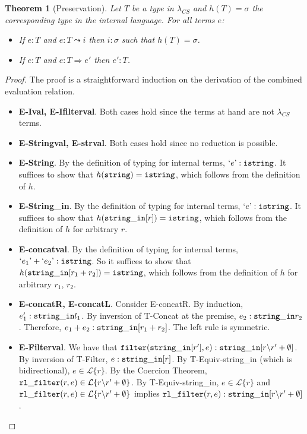 \documentclass[10pt,preprint]{sigplanconf}
\newtheorem{thm}{Theorem}
\theoremstyle{definition}
\newcommand{\Lagr}{\mathcal{L}}
\newcommand{\strin}{{\tt string\_in}}
\newcommand{\lang}[1]{\Lagr\{#1\}}
\newcommand{\str}{ {\tt string} }
\newcommand{\istr}{ {\tt istring} }
\newcommand{\filter}[2]{ {\tt filter}(#1,#2) }
\newcommand{\reduces}{ \Rightarrow }
\newcommand{\ireduces}{ \leadsto }
\newcommand{\istrf}[1]{`#1\textrm'} %
\newcommand{\lcs}{\lambda_{CS}}
\begin{document}
\begin{thm}[Preservation]
  Let $T$ be a type in $\lcs$ and $h(T)=\sigma$ the corresponding type in the internal language.
  For all terms $e$:
  \begin{itemize}
    \item If $e:T$ and $e:T \ireduces i$ then $i : \sigma$ such that $h(T) = \sigma$.
    \item If $e:T$ and $e:T \reduces e'$ then $e':T$.
  \end{itemize}
\end{thm}
\begin{proof}
The proof is a straightforward induction on the derivation of the combined evaluation relation.
\begin{itemize}[label=$ $,itemsep=1ex]
  \item \textbf{E-Ival, E-Ifilterval}. Both cases hold since the terms at hand are not $\lcs$ terms.
  \item \textbf{E-Stringval, E-strval}. Both cases hold since no reduction is possible. 
  \item \textbf{E-String}. By the definition of typing for internal terms, $\istrf{e} : \istr$. It suffices to show that $h(\str) = \istr$, which follows from the definition of $h$.
  \item \textbf{E-String\_in}. By the definition of typing for internal terms, $\istrf{e} : \istr$. It suffices to show that $h(\strin[r]) = \istr$, which follows from the definition of $h$ for arbitrary $r$.
  \item \textbf{E-concatval}. By the definition of typing for internal terms, $\istrf{e_1} + \istrf{e_2} : \istr$. So it suffices to show that $h(\strin[r_1+r_2]) = \istr$, which follows from the definition of $h$ for arbitrary $r_1$, $r_2$.
  \item \textbf{E-concatR, E-concatL}. Consider E-concatR. By induction, $e_1' : \strin{l_1}$. By inversion of T-Concat at the premise, $e_2 : \strin{r_2}$. Therefore, $e_1 + e_2 : \strin[r_1 + r_2]$. The left rule is symmetric.
  \item \textbf{E-Filterval}. We have that $\filter{\strin[r']}{e}:\strin[r\backslash r' + \emptyset]$. By inversion of T-Filter, $e:\strin[r]$.
    By T-Equiv-string\_in (which is bidirectional), $e \in \lang{r}$.
    By the Coercion Theorem, ${\tt rl\_filter}(r,e) \in \lang{r\backslash r' + \emptyset}$.
    By T-Equiv-string\_in,  $e \in \lang{r}$ and ${\tt rl\_filter}(r,e) \in \lang{r\backslash r' + \emptyset}$ implies ${\tt rl\_filter}(r,e):\strin[r\backslash r' + \emptyset]$.

\end{itemize}
\end{proof}
\end{document}
